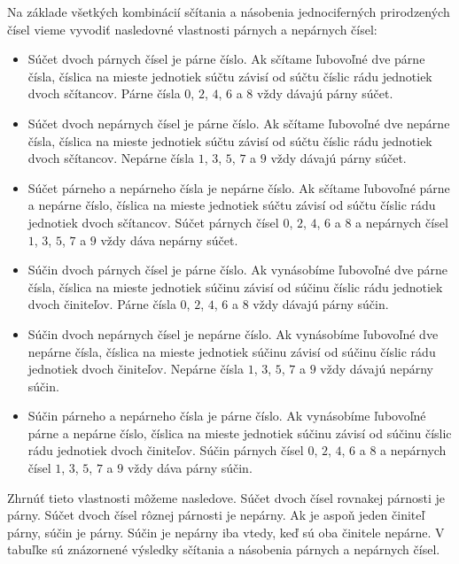\documentclass{report}
\begin{document}
Na základe všetkých kombinácií sčítania a násobenia jednociferných prirodzených čísel vieme vyvodiť nasledovné vlastnosti párnych a nepárnych čísel:
\begin{itemize}
  \item Súčet dvoch párnych čísel je párne číslo. Ak sčítame ľubovoľné dve párne čísla, číslica na mieste jednotiek súčtu závisí od súčtu číslic rádu jednotiek dvoch sčítancov. Párne čísla \(0\), \(2\), \(4\), \(6\) a \(8\) vždy dávajú párny súčet.
  \item Súčet dvoch nepárnych čísel je párne číslo. Ak sčítame ľubovoľné dve nepárne čísla, číslica na mieste jednotiek súčtu závisí od súčtu číslic rádu jednotiek dvoch sčítancov. Nepárne čísla \(1\), \(3\), \(5\), \(7\) a \(9\) vždy dávajú párny súčet.
  \item Súčet párneho a nepárneho čísla je nepárne číslo. Ak sčítame ľubovoľné párne a nepárne číslo, číslica na mieste jednotiek súčtu závisí od súčtu číslic rádu jednotiek dvoch sčítancov. Súčet párnych čísel \(0\), \(2\), \(4\), \(6\) a \(8\) a nepárnych čísel \(1\), \(3\), \(5\), \(7\) a \(9\) vždy dáva nepárny súčet.
  \item Súčin dvoch párnych čísel je párne číslo. Ak vynásobíme ľubovoľné dve párne čísla, číslica na mieste jednotiek súčinu závisí od súčinu číslic rádu jednotiek dvoch činiteľov. Párne čísla \(0\), \(2\), \(4\), \(6\) a \(8\) vždy dávajú párny súčin.
  \item Súčin dvoch nepárnych čísel je nepárne číslo. Ak vynásobíme ľubovoľné dve nepárne čísla, číslica na mieste jednotiek súčinu závisí od súčinu číslic rádu jednotiek dvoch činiteľov. Nepárne čísla \(1\), \(3\), \(5\), \(7\) a \(9\) vždy dávajú nepárny súčin.
  \item Súčin párneho a nepárneho čísla je párne číslo. Ak vynásobíme ľubovoľné párne a nepárne číslo, číslica na mieste jednotiek súčinu závisí od súčinu číslic rádu jednotiek dvoch činiteľov. Súčin párnych čísel \(0\), \(2\), \(4\), \(6\) a \(8\) a nepárnych čísel \(1\), \(3\), \(5\), \(7\) a \(9\) vždy dáva párny súčin.
\end{itemize}
Zhrnúť tieto vlastnosti môžeme nasledove. Súčet dvoch čísel rovnakej párnosti je párny. Súčet dvoch čísel rôznej párnosti je nepárny. Ak je aspoň jeden činiteľ párny, súčin je párny. Súčin je nepárny iba vtedy, keď sú oba činitele nepárne. V tabuľke sú znázornené výsledky sčítania a násobenia párnych a nepárnych čísel.
\end{document}
